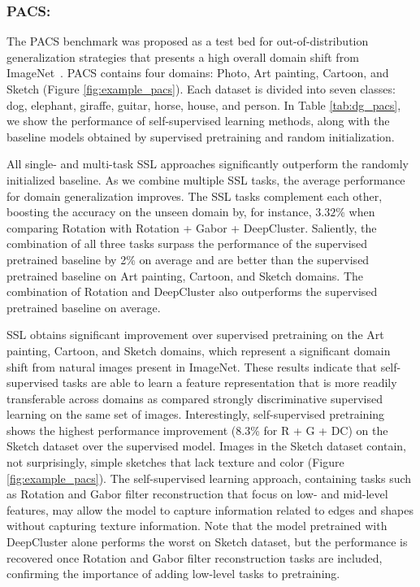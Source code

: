 \documentclass[runningheads]{llncs}
\begin{document}
\vspace{-5pt}\subsubsection{PACS:} The PACS benchmark  was proposed as a test bed for out-of-distribution generalization strategies that presents a high overall domain shift from ImageNet~\cite{li2017deeper}. 
PACS contains four domains: Photo, Art painting, Cartoon, and Sketch (Figure \ref{fig:example_pacs}). Each dataset is divided into seven classes: dog, elephant, giraffe, guitar, horse, house, and person. 
In Table \ref{tab:dg_pacs}, we show the performance of self-supervised learning methods, along with the baseline models obtained by supervised pretraining and random initialization. 

All single- and multi-task SSL approaches significantly outperform the randomly initialized baseline. 
As we combine multiple SSL tasks, the average performance for domain generalization improves. The SSL tasks complement each other, boosting the accuracy on the unseen domain by, for instance, $3.32\%$ when comparing Rotation with Rotation + Gabor + DeepCluster. Saliently, the combination of all three tasks surpass the performance of the supervised pretrained baseline by 2\% on average and are better than the supervised pretrained baseline on Art painting, Cartoon, and Sketch domains. The combination of Rotation and DeepCluster also outperforms the supervised pretrained baseline on average. 


SSL obtains significant improvement over supervised pretraining on the Art painting, Cartoon, and Sketch domains, which represent a  significant domain shift from natural images present in ImageNet. These results indicate that self-supervised tasks are able to learn a feature representation that is more readily transferable across domains as compared strongly discriminative supervised learning on the same set of images. 
Interestingly, self-supervised pretraining shows the highest performance improvement (8.3\% for R + G + DC) on the Sketch dataset over the supervised model. Images in the Sketch dataset contain, not surprisingly, simple sketches that lack texture and color (Figure \ref{fig:example_pacs}). The self-supervised learning approach, containing tasks such as Rotation and Gabor filter reconstruction that focus on low- and mid-level features, may allow the model to capture information related to edges and shapes without capturing texture information. 
Note that the model pretrained with DeepCluster alone performs the worst on Sketch dataset, but the performance is recovered once Rotation and Gabor filter reconstruction tasks are included, confirming the importance of adding low-level tasks to pretraining. 
\end{document}
